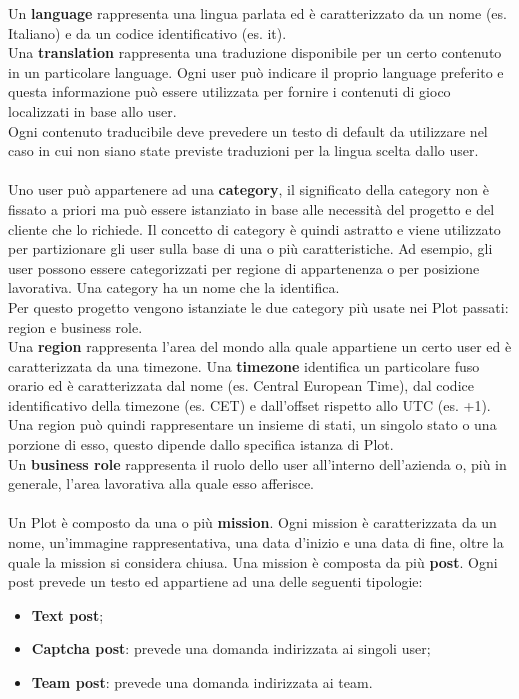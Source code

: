 Un \textbf{language} rappresenta una lingua parlata ed è caratterizzato da un nome (es. Italiano) e da un codice identificativo (es. it). \\
Una \textbf{translation} rappresenta una traduzione disponibile per un certo contenuto in un particolare language.
Ogni user può indicare il proprio language preferito e questa informazione può essere utilizzata per fornire i contenuti di gioco localizzati in base allo user. \\
Ogni contenuto traducibile deve prevedere un testo di default da utilizzare nel caso in cui non siano state previste traduzioni per la lingua scelta dallo user.
\\ \\
Uno user può appartenere ad una \textbf{category}, il significato della category non è fissato a priori ma può essere istanziato in base alle necessità del progetto e del cliente che lo richiede. Il concetto di category è quindi astratto e viene utilizzato per partizionare gli user sulla base di una o più caratteristiche.  
Ad esempio, gli user possono essere categorizzati per regione di appartenenza o per posizione lavorativa. Una category ha un nome che la identifica. \\
Per questo progetto vengono istanziate le due category più usate nei Plot passati: region e business role.\\
Una \textbf{region} rappresenta l'area del mondo alla quale appartiene un certo user ed è caratterizzata da una timezone. Una \textbf{timezone} identifica un particolare fuso orario ed è caratterizzata dal nome (es. Central European Time), dal codice identificativo della timezone (es. CET) e dall’offset rispetto allo UTC (es. +1).
Una region può quindi rappresentare un insieme di stati, un singolo stato o una porzione di esso, questo dipende dallo specifica istanza di Plot.\\
Un \textbf{business role} rappresenta il ruolo dello user all'interno dell'azienda o, più in generale, l'area lavorativa alla quale esso afferisce.
\\ \\
Un Plot è composto da una o più \textbf{mission}. Ogni mission è caratterizzata da un nome, un'immagine rappresentativa, una data d'inizio e una data di fine, oltre la quale la mission si considera chiusa.
Una mission è composta da più \textbf{post}. Ogni post prevede un testo ed appartiene ad una delle seguenti tipologie: 
\begin{itemize}
	\item \textbf{Text post};
	\item \textbf{Captcha post}: prevede una domanda indirizzata ai singoli user;
	\item \textbf{Team post}: prevede una domanda indirizzata ai team. 
\end{itemize}


